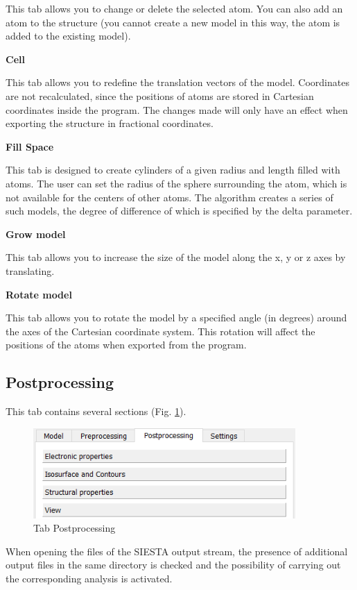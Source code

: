 \documentclass{article}
\begin{document}
This tab allows you to change or delete the selected atom. You can also add an atom to the structure (you cannot create a new model in this way, the atom is added to the existing model).

\textbf{Cell}

This tab allows you to redefine the translation vectors of the model. Coordinates are not recalculated, since the positions of atoms are stored in Cartesian coordinates inside the program. The changes made will only have an effect when exporting the structure in fractional coordinates.

\textbf{Fill Space}

This tab is designed to create cylinders of a given radius and length filled with atoms. The user can set the radius of the sphere surrounding the atom, which is not available for the centers of other atoms. The algorithm creates a series of such models, the degree of difference of which is specified by the delta parameter.

\textbf{Grow model}

This tab allows you to increase the size of the model along the x, y or z axes by translating.


\textbf{Rotate model}

This tab allows you to rotate the model by a specified angle (in degrees) around the axes of the Cartesian coordinate system. This rotation will affect the positions of the atoms when exported from the program.


\subsection{Postprocessing}

This tab contains several sections (Fig. \ref{fig:post}).

\begin{figure}[h!]
	\centering
	\includegraphics[width=10.0cm]{post}
	\caption{Tab Postprocessing}
	\label{fig:post}
\end{figure}

When opening the files of the SIESTA output stream, the presence of additional output files in the same directory is checked and the possibility of carrying out the corresponding analysis is activated. 
\end{document}

